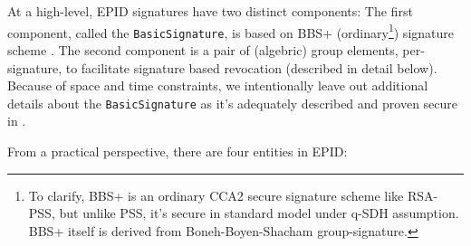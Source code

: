 \documentclass[letterpaper]{article}
\begin{document}
  At a high-level, EPID signatures have two distinct components: The
  first component, called the \texttt{BasicSignature}, is based on
  BBS+ (ordinary\footnote{To clarify, BBS+ is an ordinary CCA2 secure
    signature scheme like RSA-PSS, but unlike PSS, it's secure in
    standard model under q-SDH assumption. BBS+ itself is derived from
    Boneh-Boyen-Shacham \cite{bbs} group-signature.}) signature scheme
  \cite{bbsplus}. The second component is a pair of (algebric) group
  elements, per-signature, to facilitate signature based revocation
  (described in detail below). Because of space and time constraints,
  we intentionally leave out additional details about the
  \texttt{BasicSignature} as it's adequately described and proven
  secure in \cite{epid,bbsplus,bbs}.

  From a practical perspective, there are four entities in EPID:
  
\end{document}
